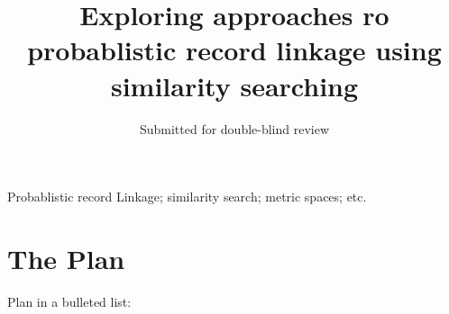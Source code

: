\documentclass{llncs}
\begin{document}
\title{Exploring approaches ro probablistic record linkage using similarity searching}

\author{Submitted for double-blind review}




\maketitle

\begin{abstract}

\end{abstract}

\keywords Probablistic record Linkage; similarity search; metric spaces; etc.


\section{The Plan}

\vspace{5mm}

Plan in a bulleted list:
\end{document}
